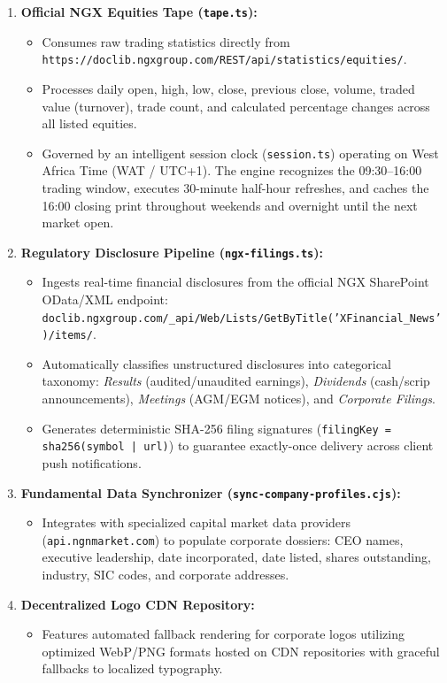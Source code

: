 \documentclass[11pt,a4paper]{article}
\begin{document}
\begin{enumerate}
    \item \textbf{Official NGX Equities Tape (\texttt{tape.ts}):}
    \begin{itemize}
        \item Consumes raw trading statistics directly from \texttt{https://doclib.ngxgroup.com/REST/api/statistics/equities/}.
        \item Processes daily open, high, low, close, previous close, volume, traded value (turnover), trade count, and calculated percentage changes across all listed equities.
        \item Governed by an intelligent session clock (\texttt{session.ts}) operating on West Africa Time (WAT / UTC+1). The engine recognizes the 09:30--16:00 trading window, executes 30-minute half-hour refreshes, and caches the 16:00 closing print throughout weekends and overnight until the next market open.
    \end{itemize}
    \item \textbf{Regulatory Disclosure Pipeline (\texttt{ngx-filings.ts}):}
    \begin{itemize}
        \item Ingests real-time financial disclosures from the official NGX SharePoint OData/XML endpoint: \texttt{doclib.ngxgroup.com/\_api/Web/Lists/GetByTitle('XFinancial\_News')/items/}.
        \item Automatically classifies unstructured disclosures into categorical taxonomy: \textit{Results} (audited/unaudited earnings), \textit{Dividends} (cash/scrip announcements), \textit{Meetings} (AGM/EGM notices), and \textit{Corporate Filings}.
        \item Generates deterministic SHA-256 filing signatures (\texttt{filingKey = sha256(symbol | url)}) to guarantee exactly-once delivery across client push notifications.
    \end{itemize}
    \item \textbf{Fundamental Data Synchronizer (\texttt{sync-company-profiles.cjs}):}
    \begin{itemize}
        \item Integrates with specialized capital market data providers (\texttt{api.ngnmarket.com}) to populate corporate dossiers: CEO names, executive leadership, date incorporated, date listed, shares outstanding, industry, SIC codes, and corporate addresses.
    \end{itemize}
    \item \textbf{Decentralized Logo CDN Repository:}
    \begin{itemize}
        \item Features automated fallback rendering for corporate logos utilizing optimized WebP/PNG formats hosted on CDN repositories with graceful fallbacks to localized typography.
    \end{itemize}
\end{enumerate}
\end{document}
